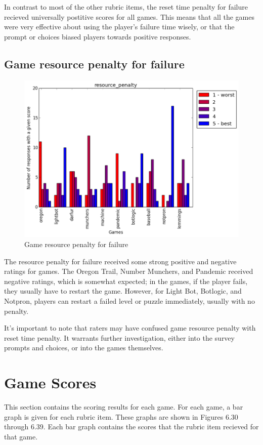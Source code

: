 				In contrast to most of the other rubric items, the reset time penalty for failure recieved universally postitive scores for all games. This means that all the games were very effective about using the player's failure time wisely, or that the prompt or choices biased players towards positive responses.

			\subsection{Game resource penalty for failure}
				\begin{figure}[] 
				\centering 
				\includegraphics[width=\textwidth, height=.4\textheight, keepaspectratio=true]{resource_penalty_scores.png} 
				\caption{Game resource penalty for failure}
				\end{figure}

				The resource penalty for failure received some strong positive and negative ratings for games. The Oregon Trail, Number Munchers, and Pandemic received negative ratings, which is somewhat expected; in the games, if the player fails, they usually have to restart the game. However, for Light Bot, Botlogic, and Notpron, players can restart a failed level or puzzle immediately, usually with no penalty.

				It's important to note that raters may have confused game resource penalty with reset time penalty. It warrants further investigation, either into the survey prompts and choices, or into the games themselves.

			\clearpage

		\section{Game Scores}
			This section contains the scoring results for each game. For each game, a bar graph is given for each rubric item. These graphs are shown in Figures 6.30 through 6.39. Each bar graph contains the scores that the rubric item recieved for that game.

